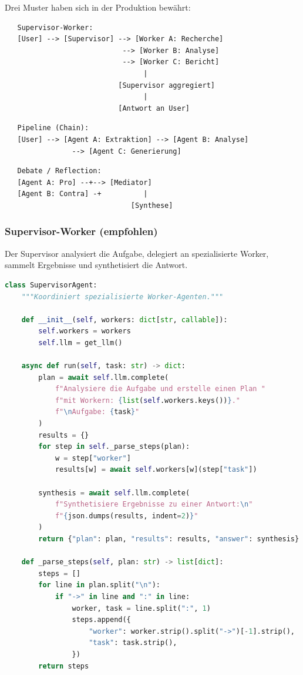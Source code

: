 Drei Muster haben sich in der Produktion bewährt:

\begin{verbatim}
   Supervisor-Worker:
   [User] --> [Supervisor] --> [Worker A: Recherche]
                            --> [Worker B: Analyse]
                            --> [Worker C: Bericht]
                                 |
                           [Supervisor aggregiert]
                                 |
                           [Antwort an User]
\end{verbatim}

\begin{verbatim}
   Pipeline (Chain):
   [User] --> [Agent A: Extraktion] --> [Agent B: Analyse]
                --> [Agent C: Generierung]
\end{verbatim}

\begin{verbatim}
   Debate / Reflection:
   [Agent A: Pro] --+--> [Mediator]
   [Agent B: Contra] -+          |
                              [Synthese]
\end{verbatim}

\subsubsection{Supervisor-Worker (empfohlen)}

Der Supervisor analysiert die Aufgabe, delegiert an spezialisierte Worker, sammelt Ergebnisse und synthetisiert die Antwort.

\begin{lstlisting}[language=Python, caption=Supervisor-Worker-Architektur]
class SupervisorAgent:
    """Koordiniert spezialisierte Worker-Agenten."""

    def __init__(self, workers: dict[str, callable]):
        self.workers = workers
        self.llm = get_llm()

    async def run(self, task: str) -> dict:
        plan = await self.llm.complete(
            f"Analysiere die Aufgabe und erstelle einen Plan "
            f"mit Workern: {list(self.workers.keys())}."
            f"\nAufgabe: {task}"
        )
        results = {}
        for step in self._parse_steps(plan):
            w = step["worker"]
            results[w] = await self.workers[w](step["task"])

        synthesis = await self.llm.complete(
            f"Synthetisiere Ergebnisse zu einer Antwort:\n"
            f"{json.dumps(results, indent=2)}"
        )
        return {"plan": plan, "results": results, "answer": synthesis}

    def _parse_steps(self, plan: str) -> list[dict]:
        steps = []
        for line in plan.split("\n"):
            if "->" in line and ":" in line:
                worker, task = line.split(":", 1)
                steps.append({
                    "worker": worker.strip().split("->")[-1].strip(),
                    "task": task.strip(),
                })
        return steps
\end{lstlisting}

